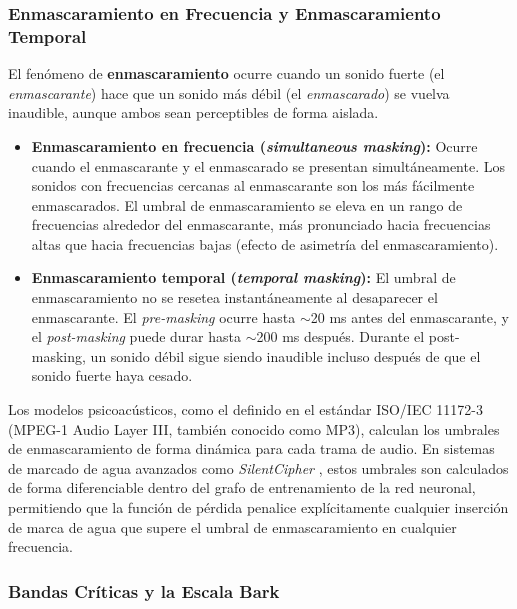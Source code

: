 \subsubsection{Enmascaramiento en Frecuencia y Enmascaramiento Temporal}

El fenómeno de \textbf{enmascaramiento} ocurre cuando un sonido fuerte (el \textit{enmascarante}) hace que un sonido más débil (el \textit{enmascarado}) se vuelva inaudible, aunque ambos sean perceptibles de forma aislada.

\begin{itemize}
    \item \textbf{Enmascaramiento en frecuencia (\textit{simultaneous masking}):} Ocurre cuando el enmascarante y el enmascarado se presentan simultáneamente. Los sonidos con frecuencias cercanas al enmascarante son los más fácilmente enmascarados. El umbral de enmascaramiento se eleva en un rango de frecuencias alrededor del enmascarante, más pronunciado hacia frecuencias altas que hacia frecuencias bajas (efecto de asimetría del enmascaramiento).

    \item \textbf{Enmascaramiento temporal (\textit{temporal masking}):} El umbral de enmascaramiento no se resetea instantáneamente al desaparecer el enmascarante. El \textit{pre-masking} ocurre hasta $\sim$20 ms antes del enmascarante, y el \textit{post-masking} puede durar hasta $\sim$200 ms después. Durante el post-masking, un sonido débil sigue siendo inaudible incluso después de que el sonido fuerte haya cesado.
\end{itemize}

Los modelos psicoacústicos, como el definido en el estándar ISO/IEC 11172-3 (MPEG-1 Audio Layer III, también conocido como MP3), calculan los umbrales de enmascaramiento de forma dinámica para cada trama de audio. En sistemas de marcado de agua avanzados como \textit{SilentCipher} \cite{singh2024silentcipher}, estos umbrales son calculados de forma diferenciable dentro del grafo de entrenamiento de la red neuronal, permitiendo que la función de pérdida penalice explícitamente cualquier inserción de marca de agua que supere el umbral de enmascaramiento en cualquier frecuencia.

\subsubsection{Bandas Críticas y la Escala Bark}

